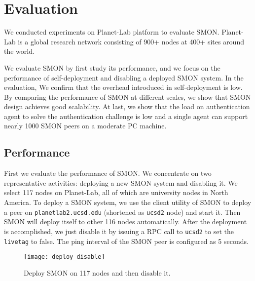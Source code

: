 \section{Evaluation}
\label{sec:eval}

We conducted experiments on Planet-Lab platform to evaluate
SMON. Planet-Lab is a global research network consisting of
900+ nodes at 400+ sites around the world.

We evaluate SMON by first study its performance, and we
focus on the performance of self-deployment and disabling a
deployed SMON system. In the evaluation, We confirm that the
overhead introduced in self-deployment is low. By comparing
the performance of SMON at different scales, we show that
SMON design achieves good scalability. At last, we show that
the load on authentication agent to solve the authentication
challenge is low and a single agent can support nearly 1000
SMON peers on a moderate PC machine.

%

\subsection{Performance}

First we evaluate the performance of SMON. We concentrate on
two representative activities: deploying a new SMON system
and disabling it. We select 117 nodes on Planet-Lab, all of
which are university nodes in North America. To deploy a
SMON system, we use the client utility of SMON to deploy a
peer on \texttt{planet\-lab2.ucsd.edu} (shortened as
\texttt{ucsd2} node) and start it. Then SMON will deploy
itself to other 116 nodes automatically. After the
deployment is accomplished, we just disable it by issuing a
RPC call to \texttt{ucsd2} to set the \texttt{livetag} to
false.  The ping interval of the SMON peer is configured as
5 seconds.
\begin{figure}[hbt]
\centering
\texttt{[image: deploy\_disable]}
\caption{Deploy SMON on 117 nodes and then disable it.}
\label{fig:smonperf}
\end{figure}

